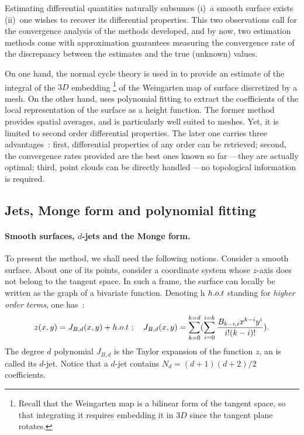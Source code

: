 


Estimating differential quantities naturally subsumes (i)\ a smooth
surface exists (ii)\ one wishes to recover its differential
properties. This two observations call for the convergence analysis of
the methods developed, and by now, two estimation methods come with
approximation guarantees measuring the convergence rate of the
discrepancy between the estimates and the true (unknown) values.

On one hand, the normal cycle theory is used in
\cite{cgal:csm-rdtnc-03} to provide an estimate of the  integral of the
$3D$ embedding \footnote{Recall that the Weingarten map is a bilinear
form of the tangent space, so that integrating it requires embedding
it in $3D$ since the tangent plane rotates.} of the Weingarten map of
surface discretized by a mesh.  On the other hand,
\cite{cgal:cp-edqpf-05} uses polynomial fitting to extract the
coefficients of the local representation of the surface as a height
function. The former method provides spatial averages, and is
particularly well suited to meshes. Yet, it is limited to second order
differential properties.
The later one carries three advantages~: first, differential
properties of any order can be retrieved; second, the convergence
rates provided are the best ones known so far ---they are actually
optimal; third, point clouds can be directly handled ---no topological
information is required.


\subsection{Jets, Monge form and polynomial fitting}

\paragraph{Smooth surfaces, $d$-jets and the Monge form.}
%
To present the method, we shall need the following notions. Consider a
smooth surface.  About one of its points, consider a coordinate system
whose $z$-axis does not belong to the tangent space. In such a frame,
the surface can locally be written as the graph of a bivariate
function. Denoting h $h.o.t$ standing for {\em higher order terms}, one
has~:
%
\begin{equation}
z(x,y)=J_{B,d}(x,y) + h.o.t \ ; \quad 
J_{B,d}(x,y)=\sum_{k=0}^{k=d}(\sum_{i=0}^{i=k}
\frac{B_{k-i,i}x^{k-i}y^{i}}{i!(k-i)!}).
\end{equation}
The degree $d$ polynomial $J_{B,d}$ is the Taylor expansion of the
function $z$, an is called its $d$-jet. Notice that a $d$-jet contains
$N_d=(d+1)(d+2)/2$ coefficients.

